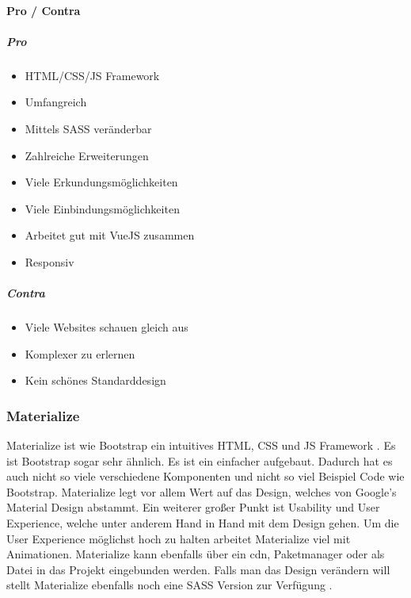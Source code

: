 		\paragraph{Pro / Contra}
		\subparagraph{Pro}
		\begin{itemize}
			\item HTML/CSS/JS Framework
			\item Umfangreich
			\item Mittels SASS veränderbar
			\item Zahlreiche Erweiterungen
			\item Viele Erkundungsmöglichkeiten
			\item Viele Einbindungsmöglichkeiten
			\item Arbeitet gut mit VueJS zusammen
			\item Responsiv
		\end{itemize}
		\subparagraph{Contra}
		\begin{itemize}
			\item Viele Websites schauen gleich aus
			\item Komplexer zu erlernen
			\item Kein schönes Standarddesign
		\end{itemize}
	
		\subsubsection{Materialize}
		Materialize ist wie Bootstrap ein intuitives HTML, CSS und JS Framework \cite{materialize-intro}. Es ist Bootstrap sogar sehr ähnlich. Es ist ein einfacher aufgebaut. Dadurch hat es auch nicht so viele verschiedene Komponenten und nicht so viel Beispiel Code wie Bootstrap. Materialize legt vor allem Wert auf das Design, welches von Google's Material Design abstammt. Ein weiterer großer Punkt ist Usability und User Experience, welche unter anderem Hand in Hand mit dem Design gehen. Um die User Experience möglichst hoch zu halten arbeitet Materialize viel mit Animationen. Materialize kann ebenfalls über ein \Gls{cdn}, Paketmanager oder als Datei in das Projekt eingebunden werden. Falls man das Design verändern will stellt Materialize ebenfalls noch eine SASS Version zur Verfügung \cite{materialize-docu}.
